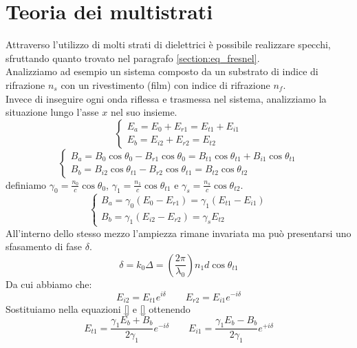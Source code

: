 \documentclass{article}
\begin{document}
\section{Teoria dei multistrati}
Attraverso l'utilizzo di molti strati di dielettrici è possibile realizzare specchi, sfruttando quanto trovato nel paragrafo \ref{section:eq_fresnel}.\\
Analizziamo ad esempio un sistema composto da un substrato di indice di rifrazione $n_s$ con un rivestimento (film) con indice di rifrazione $n_f$.\\
Invece di inseguire ogni onda riflessa e trasmessa nel sistema, analizziamo la situazione lungo l'asse $x$ nel suo insieme.
\begin{equation}
\begin{cases}
E_a = E_0 + E_{r1} = E_{t1} + E_{i1}\\
E_b = E_{i2} + E_{r2} = E_{t2}
\end{cases}
\end{equation}
\begin{equation*}
\begin{cases}
B_a = B_0 \cos \theta_0 - B_{r1} \cos \theta_0 = B_{t1} \cos \theta_{t1} + B_{i1} \cos \theta_{t1} \\
B_b = B_{i2} \cos \theta_{t1} - B_{r2} \cos \theta_{t1} = B_{t2} \cos \theta_{t2}
\end{cases}
\end{equation*}
definiamo $\gamma_0 = \frac{n_0}{c} \cos \theta_0$, $\gamma_1 = \frac{n_1}{c} \cos \theta_{t1}$ e $\gamma_s = \frac{n_s}{c} \cos \theta_{t2}$.
\begin{equation}
\begin{cases}
B_a = \gamma_0 (E_0 - E_{r1}) = \gamma_1 (E_{t1} - E_{i1})\\
B_b = \gamma_1 (E_{i2} - E_{r2}) = \gamma_s E_{t2}
\end{cases}
\end{equation}
All'interno dello stesso mezzo l'ampiezza rimane invariata ma può presentarsi uno sfasamento di fase $\delta$.
\begin{equation}
\delta = k_0 \Delta = (\frac{2\pi}{\lambda_0}) n_1 d \cos \theta_{t1}
\end{equation}
Da cui abbiamo che:
\begin{equation}
E_{i2} = E_{t1} e^{i \delta} \qquad  E_{r2} = E_{i1} e^{-i \delta}
\end{equation}
Sostituiamo nella equazioni \eqref{} e \eqref{} ottenendo
\begin{equation}
E_{t1} = \frac{\gamma_1 E_b + B_b}{2 \gamma_1}e^{-i\delta} \qquad E_{i1} = \frac{\gamma_1 E_b - B_b}{2 \gamma_1}e^{+i\delta}
\end{equation}
\end{document}
